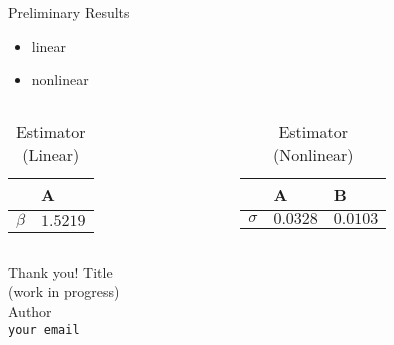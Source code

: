 \documentclass[usenames,dvipsnames]{beamer}
\begin{document}
\begin{frame}{Preliminary Results}
\begin{itemize}
    \item linear
    \item nonlinear
\end{itemize}

\begin{columns}
    \begin{column}{0.38\textwidth}
    {\centering
\begin{table}[!h]
\label{tab-est}
\caption{Estimator (Linear) }
\begin{tabular}{@{}ll@{}}
\toprule
 & A \\ \midrule
 $\beta$& $1.5219$ \\
 \bottomrule
\end{tabular}
\end{table}
}
    \end{column}
    \begin{column}{0.58\textwidth}
        {\centering
        \begin{table}[!h]
\label{tab-est-demo}
\caption{Estimator (Nonlinear)}
\begin{tabular}{@{}lll@{}}
\toprule
 & A & B \\ \midrule
 $\sigma$ & $0.0328$&$0.0103$ \\
 \bottomrule
\end{tabular}
\end{table}
        
        }
    \end{column}
\end{columns}
\end{frame}





\begin{frame}{Thank you!}
\centering
Title\\
(work in progress)\\
Author\\
\bigskip
\texttt{your email}
\end{frame}
\end{document}
